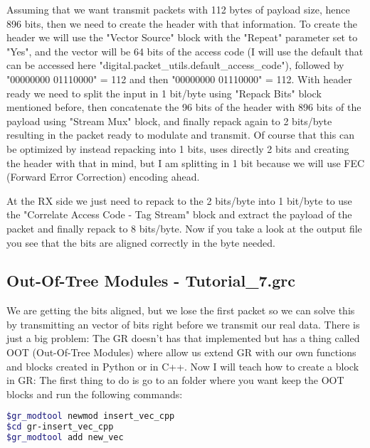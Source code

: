 \documentclass[a4paper, 10pt, conference]{ieeeconf}      %
\begin{document}
    Assuming that we want transmit packets with 112 bytes of payload size, hence 896 bits, then we need to create the header with that information. 
    To create the header we will use the "Vector Source" block with the "Repeat" parameter set to "Yes", and the vector will be 64 bits of the access code (I will use the default that can be accessed here "digital.packet\_utils.default\_access\_code"), followed by "00000000 01110000" = 112 and then "00000000 01110000" = 112. With header ready we need to split the input in 1 bit/byte using "Repack Bits" block mentioned before, then concatenate the 96 bits of the header with 896 bits of the payload using "Stream Mux" block, and finally repack again to 2 bits/byte resulting in the packet ready to modulate and transmit. Of course that this can be optimized by instead repacking into 1 bits, uses directly 2 bits and creating the header with that in mind, but I am splitting in 1 bit because we will use FEC (Forward Error Correction) encoding ahead.
    
    At the RX side we just need to repack to the 2 bits/byte into 1 bit/byte to use the "Correlate Access Code - Tag Stream" block and extract the payload of the packet and finally repack to 8 bits/byte. Now if you take a look at the output file you see that the bits are aligned correctly in the byte needed.
    
\subsection{Out-Of-Tree Modules - Tutorial\_7.grc}
    We are getting the bits aligned, but we lose the first packet so we can solve this by transmitting an vector of bits right before we transmit our real data. There is just a big problem: The GR doesn't has that implemented but has a thing called OOT (Out-Of-Tree Modules) where allow us extend GR with our own functions and blocks created in Python or in C++. Now I will teach how to create a block in GR: The first thing to do is go to an folder where you want keep the OOT blocks and run the following commands: 

\begin{lstlisting}[language=bash, breaklines]
$gr_modtool newmod insert_vec_cpp
$cd gr-insert_vec_cpp
$gr_modtool add new_vec
\end{lstlisting}
\end{document}
